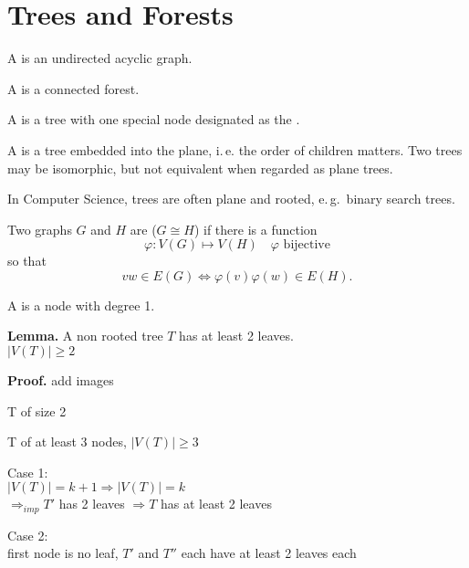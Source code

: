 \section{Trees and Forests}

\begin{definition}
A  is an undirected acyclic graph.
\end{definition}

\begin{definition}
A  is a connected forest.
\end{definition}

\begin{definition}
A  is a tree with one special node designated as the .
\end{definition}

\begin{definition}
A  is a tree embedded into the plane, i.\,e. the order of
children matters. Two trees may be isomorphic, but not equivalent when regarded
as plane trees.
\end{definition}

In Computer Science, trees are often plane and rooted, e.\,g.\ binary search trees.

\begin{definition}
Two graphs $G$ and $H$ are  ($G \cong H$) if there is a function
\[ \varphi: V(G)\mapsto V(H)\quad\text{$\varphi$ bijective} \]
so that
\[ vw \in E(G) \iff \varphi(v)\varphi(w) \in E(H). \]
\end{definition}

\begin{definition}
A  is a node with degree 1. 
\end{definition}

\textbf{Lemma.}
A non rooted tree $T$ has at least 2 leaves. \\
$|V(T)| \geq 2$

\textbf{Proof.} \TODO add images \\
\begin{compactitem}
	\item T of size 2
	\item T of at least 3 nodes, $|V(T)| \geq 3$
	\begin{compactitem}
		\item Case 1:\\
			$|V(T)| = k+1 \Rightarrow |V(T)| = k$ \\
			$\Rightarrow_{imp} T'$ has 2 leaves $\Rightarrow T$ has at least 2 leaves
		\item Case 2: \\
			first node is no leaf, $T'$ and $T''$ each have at least 2 leaves each

	\end{compactitem}
\end{compactitem}


